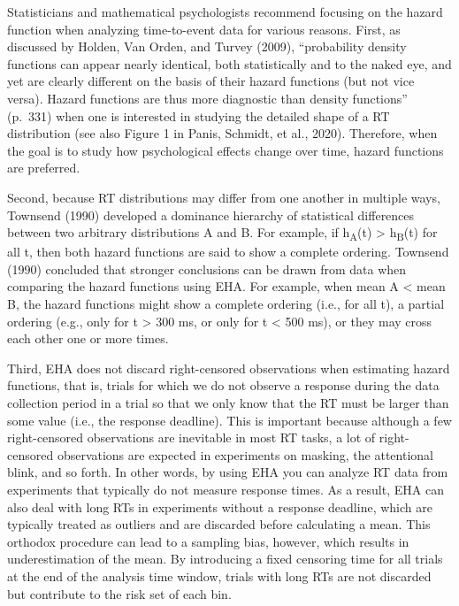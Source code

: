 \documentclass[
  man,floatsintext]{apa6}
\begin{document}
Statisticians and mathematical psychologists recommend focusing on the hazard function when analyzing time-to-event data for various reasons. First, as discussed by Holden, Van Orden, and Turvey (2009), ``probability density functions can appear nearly identical, both statistically and to the naked eye, and yet are clearly different on the basis of their hazard functions (but not vice versa). Hazard functions are thus more diagnostic than density functions'' (p.~331) when one is interested in studying the detailed shape of a RT distribution (see also Figure 1 in Panis, Schmidt, et al., 2020). Therefore, when the goal is to study how psychological effects change over time, hazard functions are preferred.

Second, because RT distributions may differ from one another in multiple ways, Townsend (1990) developed a dominance hierarchy of statistical differences between two arbitrary distributions A and B. For example, if h\textsubscript{A}(t) \textgreater{} h\textsubscript{B}(t) for all t, then both hazard functions are said to show a complete ordering. Townsend (1990) concluded that stronger conclusions can be drawn from data when comparing the hazard functions using EHA. For example, when mean A \textless{} mean B, the hazard functions might show a complete ordering (i.e., for all t), a partial ordering (e.g., only for t \textgreater{} 300 ms, or only for t \textless{} 500 ms), or they may cross each other one or more times.

Third, EHA does not discard right-censored observations when estimating hazard functions, that is, trials for which we do not observe a response during the data collection period in a trial so that we only know that the RT must be larger than some value (i.e., the response deadline). This is important because although a few right-censored observations are inevitable in most RT tasks, a lot of right-censored observations are expected in experiments on masking, the attentional blink, and so forth. In other words, by using EHA you can analyze RT data from experiments that typically do not measure response times. As a result, EHA can also deal with long RTs in experiments without a response deadline, which are typically treated as outliers and are discarded before calculating a mean. This orthodox procedure can lead to a sampling bias, however, which results in underestimation of the mean. By introducing a fixed censoring time for all trials at the end of the analysis time window, trials with long RTs are not discarded but contribute to the risk set of each bin.
\end{document}
